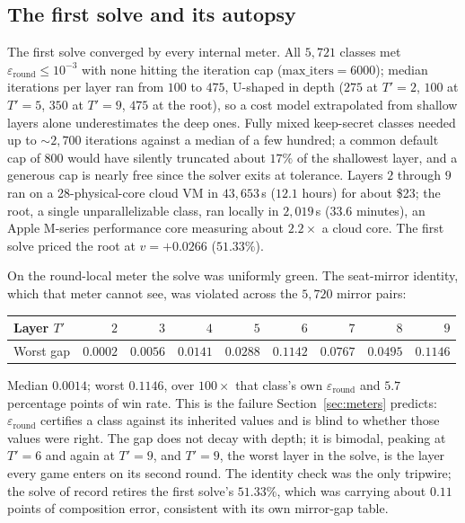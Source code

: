 \documentclass[11pt]{article}
\theoremstyle{plain}
\theoremstyle{definition}
\theoremstyle{remark}
\begin{document}
\subsection{The first solve and its autopsy}\label{sec:autopsy}

The first solve converged by every internal meter. All $5{,}721$ classes met
$\varepsilon_{\text{round}}\le10^{-3}$ with none hitting the iteration cap
($\mathrm{max\_iters}=6000$); median iterations per layer ran from $100$ to
$475$, U-shaped in depth ($275$ at $T'=2$, $100$ at $T'=5$, $350$ at $T'=9$,
$475$ at the root), so a cost model extrapolated from shallow layers alone
underestimates the deep ones. Fully mixed keep-secret classes needed up to
$\sim\!2{,}700$ iterations against a median of a few hundred; a common default
cap of $800$ would have silently truncated about $17\%$ of the shallowest layer,
and a generous cap is nearly free since the solver exits at tolerance. Layers
$2$ through $9$ ran on a 28-physical-core cloud VM in $43{,}653$\,s ($12.1$
hours) for about \$23; the root, a single unparallelizable class, ran locally in
$2{,}019$\,s ($33.6$ minutes), an Apple M-series performance core measuring
about $2.2\times$ a cloud core. The first solve priced the root at $v=+0.0266$
($51.33\%$).

On the round-local meter the solve was uniformly green. The seat-mirror
identity, which that meter cannot see, was violated across the $5{,}720$ mirror
pairs:

\begin{center}\small
\begin{tabular}{@{}lrrrrrrrr@{}}
\toprule
Layer $T'$ & $2$ & $3$ & $4$ & $5$ & $6$ & $7$ & $8$ & $9$\\
\midrule
Worst gap & $0.0002$ & $0.0056$ & $0.0141$ & $0.0288$ & $0.1142$ & $0.0767$ & $0.0495$ & $\mathbf{0.1146}$\\
\bottomrule
\end{tabular}
\end{center}

Median $0.0014$; worst $0.1146$, over $100\times$ that class's own
$\varepsilon_{\text{round}}$ and $5.7$ percentage points of win rate. This is
the failure Section~\ref{sec:meters} predicts: $\varepsilon_{\text{round}}$
certifies a class against its inherited values and is blind to whether those
values were right. The gap does not decay with depth; it is bimodal, peaking at
$T'=6$ and again at $T'=9$, and $T'=9$, the worst layer in the solve, is the
layer every game enters on its second round. The identity check was the only
tripwire; the solve of record retires the first solve's $51.33\%$, which was
carrying about $0.11$ points of composition error, consistent with its own
mirror-gap table.
\end{document}
